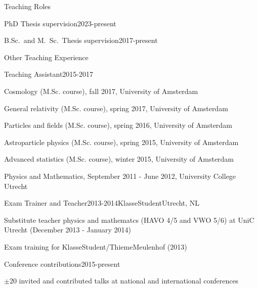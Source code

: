 \begin{rSection}{Teaching Roles}
\begin{rSubsection}{PhD Thesis supervision}{2023-present}{}{}
   \vspace{-1.5em}
      
\end{rSubsection}

\begin{rSubsection}{B.Sc.~and M.~Sc.~Thesis supervision}{2017-present}{}{}
   \vspace{-1.5em}
    
\end{rSubsection}

\end{rSection}

\begin{rSection}{Other Teaching Experience}
\begin{rSubsection}{Teaching Assistant}{2015-2017}{}{}
 \vspace{-1.5em}
	\item Cosmology (M.Sc. course), fall 2017, University of Amsterdam
	\item General relativity (M.Sc. course), spring 2017, University of Amsterdam
	\item Particles and fields (M.Sc. course), spring 2016, University of Amsterdam
	\item Astroparticle physics (M.Sc. course), spring 2015, University of Amsterdam
	\item Advanced statistics (M.Sc. course), winter 2015, University of Amsterdam
  \item Physics and Mathematics, September 2011 - June 2012, University College Utrecht 
\end{rSubsection}

\begin{rSubsection}{Exam Trainer and Teacher}{2013-2014}{KlasseStudent}{Utrecht, NL}
  \vspace{-1.5em}
  \item Substitute teacher physics and mathematcs (HAVO 4/5 and VWO 5/6) at UniC Utrecht (December 2013 - January 2014)
  \item Exam training for KlasseStudent/ThiemeMeulenhof (2013)
\end{rSubsection}

\begin{rSubsection}{Conference contributions}{2015-present}{}{}
  \vspace{-1.5em}
  \item $\pm20$ invited and contributed talks at national and international conferences
\end{rSubsection}


\end{rSection}
